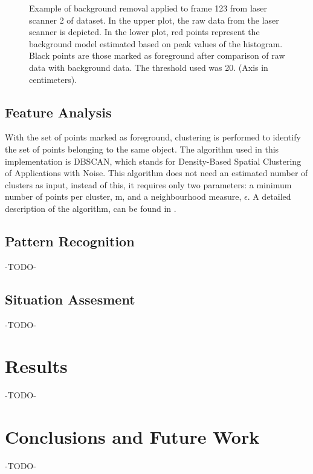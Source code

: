 \documentclass[10pt,twocolumn,letterpaper]{article}
\begin{document}
\begin{figure}[ht!]
\centering


\caption{Example of background removal applied to frame 123 from laser scanner 2 of dataset. In the upper plot, the raw data from the laser scanner is depicted. In the lower plot, red points represent the background model estimated based on peak values of the histogram. Black points are those marked as foreground after comparison of raw data with background data. The threshold used was 20. (Axis in centimeters).}
\label{bg_proc}
\end{figure}


\subsection{Feature Analysis}

With the set of points marked as foreground, clustering is performed to identify the set of points belonging to the same object. The algorithm used in this implementation is DBSCAN, which stands for Density-Based Spatial Clustering of Applications with Noise. This algorithm does not need an estimated number of clusters as input, instead of this, it requires only two parameters: a minimum number of points per cluster, m, and a neighbourhood measure, $\epsilon$. A detailed description of the algorithm, can be found in \cite{Ester96}.

\subsection{Pattern Recognition}

-TODO-

\subsection{Situation Assesment}

-TODO-

\section{Results}

-TODO-

\section{Conclusions and Future Work}

-TODO-

{\small


}
\end{document}
